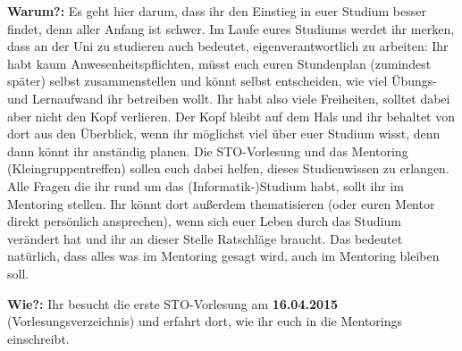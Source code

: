 \textbf{Warum?:} Es geht hier darum, dass ihr den Einstieg in euer Studium besser findet, denn aller Anfang ist schwer. Im Laufe eures Studiums werdet ihr merken, dass an der Uni zu studieren auch bedeutet, eigenverantwortlich zu arbeiten: Ihr habt kaum Anwesenheitspflichten, müsst euch euren Stundenplan (zumindest später) selbst zusammenstellen und könnt selbst entscheiden, wie viel Übungs- und Lernaufwand ihr betreiben wollt. 
Ihr habt also viele Freiheiten, solltet dabei aber nicht den Kopf verlieren. Der Kopf bleibt auf dem Hals und ihr behaltet von dort aus den Überblick, wenn ihr möglichst viel über euer Studium wisst, denn dann könnt ihr anständig planen.
Die STO-Vorlesung und das Mentoring (Kleingruppentreffen) sollen euch dabei helfen, dieses Studienwissen zu erlangen. Alle Fragen die ihr rund um das (Informatik-)Studium habt, sollt ihr im Mentoring stellen. Ihr könnt dort außerdem thematisieren (oder euren Mentor direkt persönlich ansprechen), wenn sich euer Leben durch das Studium verändert hat und ihr an dieser Stelle Ratschläge braucht. Das bedeutet natürlich, dass alles was im Mentoring gesagt wird, auch im Mentoring bleiben soll.

\textbf{Wie?:} Ihr besucht die erste STO-Vorlesung am \textbf{16.04.2015} (Vorlesungsverzeichnis) und erfahrt dort, wie ihr euch in die Mentorings einschreibt.
\spaltenende
